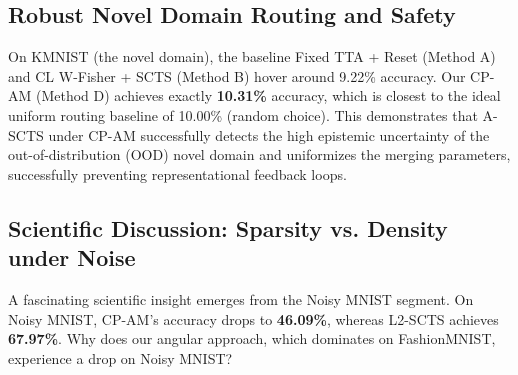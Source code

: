 \documentclass{article}
\theoremstyle{plain}
\theoremstyle{definition}
\theoremstyle{remark}
\begin{document}
\subsection{Robust Novel Domain Routing and Safety}
On KMNIST (the novel domain), the baseline Fixed TTA + Reset (Method A) and CL W-Fisher + SCTS (Method B) hover around 9.22\% accuracy. Our CP-AM (Method D) achieves exactly \textbf{10.31\%} accuracy, which is closest to the ideal uniform routing baseline of 10.00\% (random choice). This demonstrates that A-SCTS under CP-AM successfully detects the high epistemic uncertainty of the out-of-distribution (OOD) novel domain and uniformizes the merging parameters, successfully preventing representational feedback loops.

\subsection{Scientific Discussion: Sparsity vs. Density under Noise}
A fascinating scientific insight emerges from the Noisy MNIST segment. On Noisy MNIST, CP-AM's accuracy drops to \textbf{46.09\%}, whereas L2-SCTS achieves \textbf{67.97\%}. Why does our angular approach, which dominates on FashionMNIST, experience a drop on Noisy MNIST?
\end{document}
